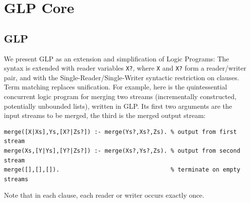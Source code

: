 
\chapter{GLP Core}
\label{ch:glp-core}

\section{GLP}\label{section:GLP}

We present GLP as an extension and simplification of Logic Programs: The syntax is extended with reader variables \verb|X?|, where \verb|X| and \verb|X?| form a reader/writer pair, and with the Single-Reader/Single-Writer syntactic restriction on clauses. Term matching replaces unification. For example, here is the quintessential concurrent logic program for merging two streams (incrementally constructed, potentially unbounded lists), written in GLP. Its first two arguments are the input streams to be merged, the third is the merged output stream:

\label{program:merge}
\begin{small}
\begin{verbatim}
merge([X|Xs],Ys,[X?|Zs?]) :- merge(Ys?,Xs?,Zs). % output from first stream
merge(Xs,[Y|Ys],[Y?|Zs?]) :- merge(Xs?,Ys?,Zs). % output from second stream
merge([],[],[]).                                % terminate on empty streams
\end{verbatim}
\end{small}
Note that in each clause, each reader or writer occurs exactly once.

